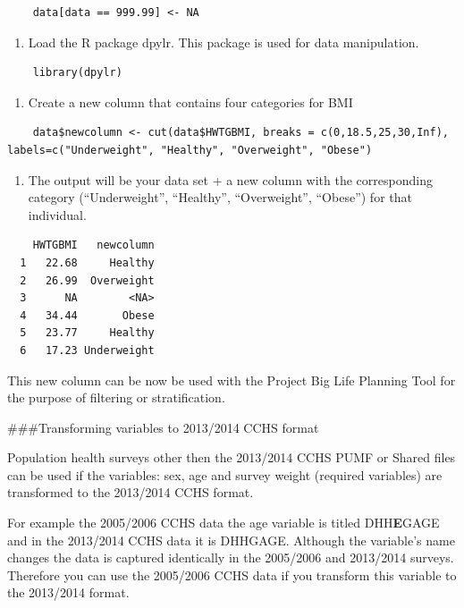 \documentclass[]{book}
\providecommand{\tightlist}{%
  \setlength{\itemsep}{0pt}\setlength{\parskip}{0pt}}
\begin{document}
\begin{verbatim}
    data[data == 999.99] <- NA
\end{verbatim}

\begin{enumerate}
\def\labelenumi{\arabic{enumi}.}
\setcounter{enumi}{1}
\tightlist
\item
  Load the R package dpylr. This package is used for data manipulation.
\end{enumerate}

\begin{verbatim}
    library(dpylr)
\end{verbatim}

\begin{enumerate}
\def\labelenumi{\arabic{enumi}.}
\setcounter{enumi}{2}
\tightlist
\item
  Create a new column that contains four categories for BMI
\end{enumerate}

\begin{verbatim}
    data$newcolumn <- cut(data$HWTGBMI, breaks = c(0,18.5,25,30,Inf),  labels=c("Underweight", "Healthy", "Overweight", "Obese")
\end{verbatim}

\begin{enumerate}
\def\labelenumi{\arabic{enumi}.}
\setcounter{enumi}{3}
\tightlist
\item
  The output will be your data set + a new column with the corresponding category (``Underweight'', ``Healthy'', ``Overweight'', ``Obese'') for that individual.
\end{enumerate}

\begin{verbatim}
    HWTGBMI   newcolumn
  1   22.68     Healthy
  2   26.99  Overweight
  3      NA        <NA>
  4   34.44       Obese
  5   23.77     Healthy
  6   17.23 Underweight
\end{verbatim}

This new column can be now be used with the Project Big Life Planning Tool for the purpose of filtering or stratification.

\#\#\#Transforming variables to 2013/2014 CCHS format

Population health surveys other then the 2013/2014 CCHS PUMF or Shared files can be used if the variables: sex, age and survey weight (required variables) are transformed to the 2013/2014 CCHS format.

For example the 2005/2006 CCHS data the age variable is titled DHH\textbf{E}GAGE and in the 2013/2014 CCHS data it is DHHGAGE. Although the variable's name changes the data is captured identically in the 2005/2006 and 2013/2014 surveys. Therefore you can use the 2005/2006 CCHS data if you transform this variable to the 2013/2014 format.
\end{document}
